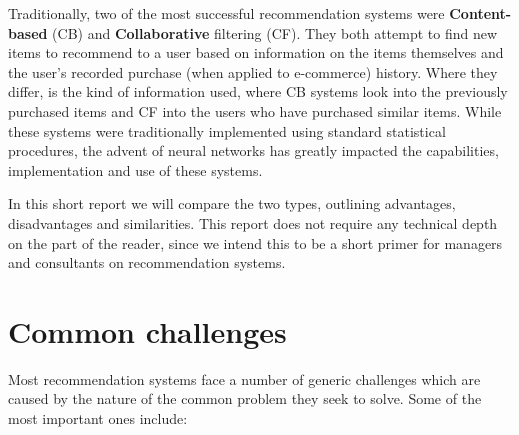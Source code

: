 \documentclass[12pt, a4paper]{article}
\begin{document}
Traditionally, two of the most successful recommendation systems were \textbf{Content-based} (CB) and \textbf{Collaborative} filtering (CF). They both attempt to find new items to recommend to a user based on information on the items themselves and the user's recorded purchase (when applied to e-commerce) history. Where they differ, is the kind of information used, where CB systems look into the previously purchased items and CF into the users who have purchased similar items. While these systems were traditionally implemented using standard statistical procedures, the advent of neural networks has greatly impacted the capabilities, implementation and use of these systems. 

In this short report we will compare the two types, outlining advantages, disadvantages and similarities. This report does not require any technical depth on the part of the reader, since we intend this to be a short primer for managers and consultants on recommendation systems.


\section{Common challenges}

Most recommendation systems face a number of generic challenges which are caused by the nature of the common problem they seek to solve. Some of the most important ones include:
\end{document}
